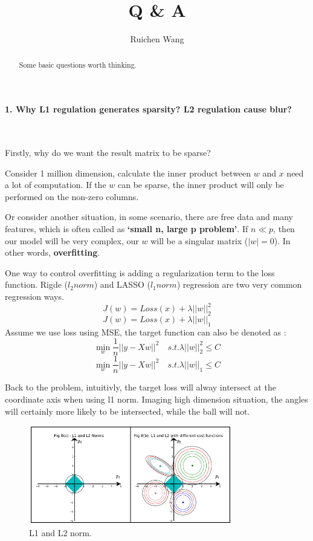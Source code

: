 \documentclass{article}
\author{Ruichen Wang}
\title{Q \& A}
\begin{document}
\maketitle
\begin{abstract}
Some basic questions worth thinking.
\end{abstract}
\noindent
\paragraph{1. Why L1 regulation generates sparsity? L2 regulation cause blur?}~{}

Firstly, why do we want the result matrix to be sparse?

Consider 1 million dimension, calculate the inner product between $w$ and $x$ need a lot of computation. If the $w$ can be sparse, the inner product will only be performed on the non-zero columns.

Or consider another situation, in some scenario, there are free data and many features, which is often called as \textbf{`small n, large p problem'}. If $n \ll p $, then our model will be very complex, our $w$ will be a singular matrix ($|w|=0$). In other words, \textbf{overfitting}.

One way to control overfitting is adding a regularization term to the loss function. Rigde  ($l_{2} norm$) and LASSO ($l_{1} norm$) regression are two very common regression ways.
$$J(w)=Loss(x)+\lambda ||w||_{2}^{2}$$
$$J(w)=Loss(x)+\lambda ||w||_{1}$$
Assume we use loss using MSE, the target function can also be denoted as :
$$ \mathop{\min}_{w} \frac{1}{n}||y-Xw||^{2} \quad  s.t. \lambda ||w||_{2}^{2} \leq C $$
$$ \mathop{\min}_{w} \frac{1}{n}||y-Xw||^{2} \quad  s.t. \lambda ||w||_{1} \leq C $$

Back to the problem, intuitivly, the target loss will alway intersect at the coordinate axis when using l1 norm. Imaging high dimension situation, the angles will certainly more likely to be intersected, while the ball will not.

\begin{figure}[H]
\centering
\includegraphics[width=3.5in,height=1.7in]{l1l2}
\caption{L1 and L2 norm.}
\end{figure}
\end{document}

